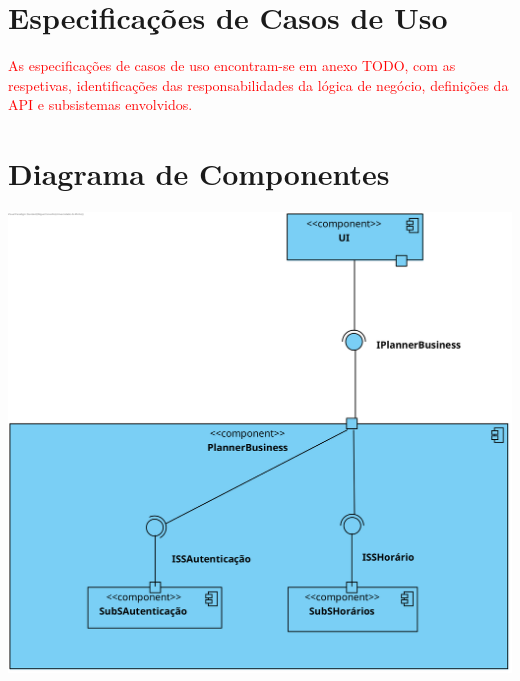 \documentclass[a4paper,12pt]{scrreprt}
\begin{document}

\chapter{Especificações de Casos de Uso}
\vspace{1cm}

\textcolor{red}{
    As especificações de casos de uso encontram-se em anexo TODO, com as respetivas,
    identificações das responsabilidades da lógica de negócio, definições da API e
    subsistemas envolvidos.
}



\chapter{Diagrama de Componentes}
\vspace{0.5cm}

\begin{minipage}{\textwidth}
    \centering
    \includegraphics[width=.5\textwidth]{images/components-diagrams/1.png}
    \label{fig:4-1-diagrama_de_componentes}
\end{minipage}

\vspace{0.5cm}
\end{document}
